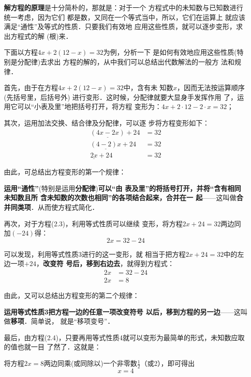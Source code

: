 \textbf{解方程的原理}是十分简朴的，那就是：对于一个
方程式中的未知数与已知数进行统一考虑，因为它们
都是数，又同在一个等式当中，所以，它们在运算上
就应该满足“通性”及等式的性质．只要我们有效地
应用这些性质，就可以逐步变形，求出方程式的解
(根)来．

下面以方程$4x+2(12-x) =32$为例，分析一下
是如何有效地应用这些性质(特别是分配律)去求出
方程的解的，从中我们可以总结出代数解法的一般方
法和规律．

首先，由于在方程$4x+2(12-x)= 32$中，含有未
知数$x$，因而无法按运算顺序(先括号里，后括号外)
进行变形．这时候，分配律就要大显身手发挥作用
了，运用它可以“小表及里”地把括号打开，将方程
变形为：$4x+2\cdot 12-2 \cdot  x = 32$；

其次，运用加法交换、结合律及分配律，可以逐
步将方程变形如下：
\begin{equation}
    \begin{split}
        \underline{(4x-2x)}+24&=32\\
        \underline{(4-2)x}+24&=32\\
        \underline{2x}+24&=32
    \end{split}
\end{equation}

由此，可总结出方程变形的第一个规律：

\textbf{运用“通性”}(特别是运用\textbf{分配律})\textbf{可以“由
表及里”的将括号打开，并将“含有相同未知数且所
含未知数的次数也相同”的各项结合起来，合并在一
起}——这叫做\textbf{合并同类项}．从而使方程式简化．

再次，对于方程(2.3)，利用等式性质可以继续
变形，将方程$2x+24 = 32$两边同加$(-24)$得：
\[2x = 32 -24\]

可以发现，利用等式性质3进行的这一变形，就
相当于把方程$2x+24 = 32$中的左边一项$+24$，\textbf{改变符
号后，移到右边去}，就得到方程式：
\begin{equation}
    \begin{split}
        2x &= 32 -24\\
        2x&=8
    \end{split}
\end{equation}

由此，又可以总结出方程变形的第二个规律：

\textbf{运用等式性质3把方程一边的任意一项改变符号
以后，移到方程的另一边}——这叫做\textbf{移项}．简单说，
就是“移项变号”．

最后，由方程(2.4)，只要再用等式性质4就可以变形为最简单的形式，未知数应取的值也就一目
了然了．这就是：

将方程$2x = 8$两边同乘(或同除以)一个非零数$\frac{1}{2}$（或2），即可得出
\begin{equation}
    x=4
\end{equation}

